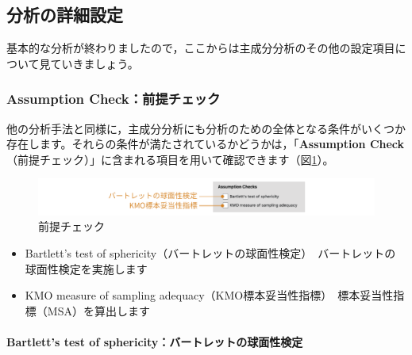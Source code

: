 \documentclass[
  12pt,
  a5jpaper,
  lualatex, ja=standard]{bxjsbook}
\providecommand{\tightlist}{%
  \setlength{\itemsep}{0pt}\setlength{\parskip}{0pt}}
\newenvironment{jmvsettings}{%
	\begin{center}%
	\begin{tcolorbox}[%
		title=設定項目,
		colframe=gmoji,
		colbacktitle=gmoji,
		colback=gmoji!2!white,
		breakable,
		width=.9\textwidth,
		]\small\addtolength{\leftmargini}{-3\labelsep}%
	}%
	{\end{tcolorbox}\end{center}}
\begin{document}
\hypertarget{sub:factor-pca-details}{%
\subsection{分析の詳細設定}\label{sub:factor-pca-details}}

基本的な分析が終わりましたので，ここからは主成分分析のその他の設定項目について見ていきましょう。

\hypertarget{subsub:factor-pca-assumption}{%
\subsubsection*{Assumption Check：前提チェック}\label{subsub:factor-pca-assumption}}

他の分析手法と同様に，主成分分析にも分析のための全体となる条件がいくつか存在します。それらの条件が満たされているかどうかは，「\textbf{Assumption Check}（前提チェック）」に含まれる項目を用いて確認できます（図\ref{fig:factor-pca-assumption}）。

\begin{figure}[!ht]

{\centering \includegraphics[width=1\linewidth]{images/factor/pca-assumption} 

}

\caption{前提チェック}\label{fig:factor-pca-assumption}
\end{figure}

\begin{jmvsettings}

\begin{itemize}
\tightlist
\item
  Bartlett's test of sphericity（バートレットの球面性検定）　バートレットの球面性検定を実施します
\item
  KMO measure of sampling adequacy（KMO標本妥当性指標）　標本妥当性指標（MSA）を算出します
\end{itemize}

\end{jmvsettings}

\hypertarget{bartletts-test-of-sphericityux30d0ux30fcux30c8ux30ecux30c3ux30c8ux306eux7403ux9762ux6027ux691cux5b9a}{%
\paragraph*{Bartlett's test of sphericity：バートレットの球面性検定}\label{bartletts-test-of-sphericityux30d0ux30fcux30c8ux30ecux30c3ux30c8ux306eux7403ux9762ux6027ux691cux5b9a}}
\end{document}
